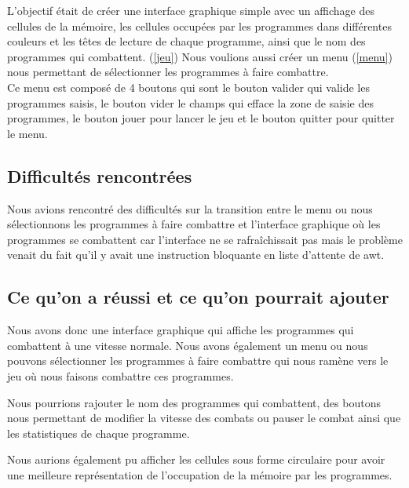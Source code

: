 \documentclass[a4paper,12pt]{article} %
\begin{document}
L'objectif était de créer une interface graphique simple avec un affichage des cellules de la mémoire, les cellules occupées par les programmes dans différentes couleurs et les têtes de lecture de chaque programme, ainsi que le nom des programmes qui combattent. (\ref{jeu})
Nous voulions aussi créer un menu (\ref{menu}) nous permettant de sélectionner les programmes à faire combattre.\\
Ce menu est composé de 4 boutons qui sont le bouton valider qui valide les programmes saisis, le bouton vider le champs qui efface la zone de saisie des programmes, le bouton jouer pour lancer le jeu et le bouton quitter pour quitter le menu.

\subsection{Difficultés rencontrées}

Nous avions rencontré des difficultés sur la transition entre le menu ou nous sélectionnons les programmes à faire combattre et l'interface graphique où les programmes se combattent car l'interface ne se rafraîchissait pas mais le problème venait du fait qu'il y avait une instruction bloquante en liste d'attente de awt.

\subsection{Ce qu'on a réussi et ce qu'on pourrait ajouter}

Nous avons donc une interface graphique qui affiche les programmes qui combattent à une vitesse normale. Nous avons également un menu ou nous pouvons sélectionner les programmes à faire combattre qui nous ramène vers le jeu où nous faisons combattre ces programmes. 

Nous pourrions rajouter le nom des programmes qui combattent, des boutons nous permettant de modifier la vitesse des combats ou pauser le combat ainsi que les statistiques de chaque programme.

Nous aurions également pu afficher les cellules sous forme circulaire pour avoir une meilleure représentation de l'occupation de la mémoire par les programmes.

\newpage
\end{document}
